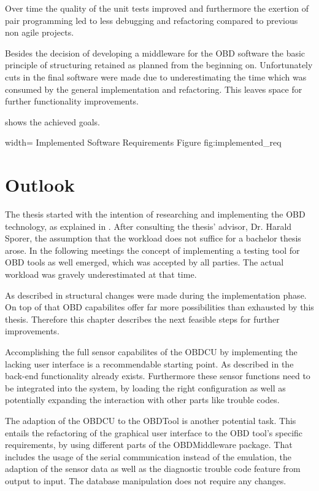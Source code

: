 Over time the quality of the unit tests improved and furthermore the exertion of pair programming led to less debugging and refactoring compared 
to previous non agile projects.

Besides the decision of developing a middleware for the OBD software the basic principle of structuring retained as planned from the beginning 
on. Unfortunately cuts in the final software were made due to underestimating the time which was consumed by the general implementation and 
refactoring. This leaves space for further functionality improvements.

 shows the achieved goals.

 {width=\textwidth}%
 {Implemented Software Requirements}%
 {Figure}%
 {fig:implemented_req}%

\section{Outlook}
\label{sec:outlook}

The thesis started with the intention of researching and implementing the OBD technology, as explained in . After consulting 
the thesis' advisor, Dr. Harald Sporer, the assumption that the workload does not suffice for a bachelor thesis arose. In the following meetings 
the concept of implementing a testing tool for OBD tools as well emerged, which was accepted by all parties. The actual workload was gravely 
underestimated at that time.

As described in  structural changes were made during the implementation phase. On top of that OBD capabilites 
offer far more possibilities than exhausted by this thesis. Therefore this chapter describes the next feasible steps for further improvements.

Accomplishing the full sensor capabilites of the OBDCU by implementing the lacking user interface is a recommendable starting point. 
As described in  the back-end functionality already exists. Furthermore these sensor functions need to be integrated into the system, by
loading the right configuration as well as potentially expanding the interaction with other parts like trouble codes. 

The adaption of the OBDCU to the OBDTool is another potential task. This entails the refactoring of the graphical user interface to the OBD tool's specific 
requirements, by using different parts of the OBDMiddleware package. That includes the usage of the serial communication instead of the emulation, the adaption of the sensor data 
as well as the diagnostic trouble code feature from output to input. The database manipulation does not require any changes. 

